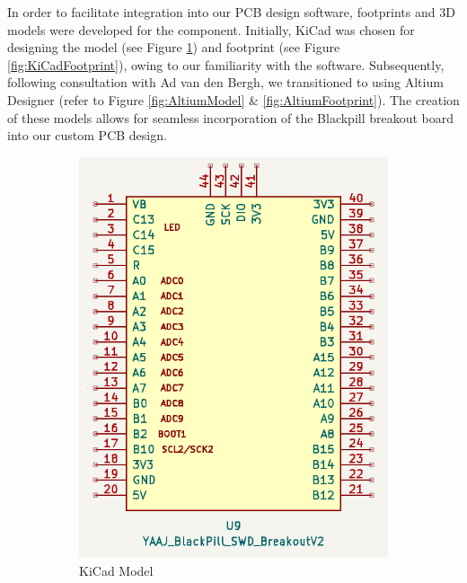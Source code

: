 In order to facilitate integration into our PCB design software, footprints and 3D models were developed for the component. Initially, KiCad was chosen for designing the model (see Figure \ref{fig:KiCadModel}) and footprint (see Figure \ref{fig:KiCadFootprint}), owing to our familiarity with the software. Subsequently, following consultation with Ad van den Bergh\cite{Adje}, we transitioned to using Altium Designer (refer to Figure \ref{fig:AltiumModel} \& \ref{fig:AltiumFootprint}). The creation of these models allows for seamless incorporation of the Blackpill breakout board into our custom PCB design.


\begin{figure}[H]
    \centering
    \begin{subfigure}{0.2\textwidth}
        \includegraphics[width=\linewidth]{img//blackpill/KiCadMODEL.png}
        \caption{KiCad Model}
        \label{fig:KiCadModel}
    \end{subfigure}
    \hfill
    \begin{subfigure}{0.1\textwidth}

\end{subfigure}
\end{figure}
